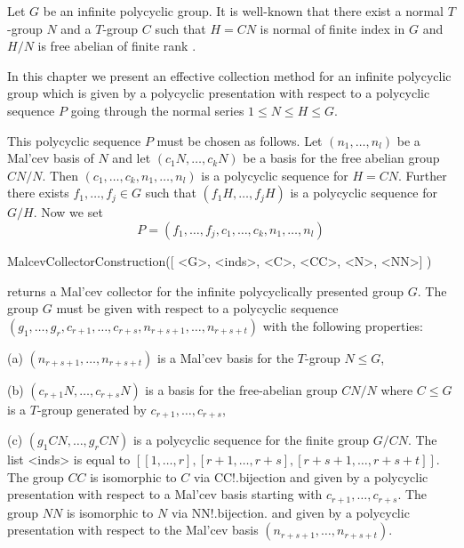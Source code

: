 

Let $G$ be an infinite polycyclic group. It is well-known that
there exist  a normal
${T}$-group $N$ and a ${T}$-group $C$ such that $H=CN$ is normal
of finite
index in $G$ and  $H/N$ is free abelian of finite rank \cite{Seg83}. 

In this chapter
we present an effective collection method for an infinite
polycyclic group which is given by a polycyclic presentation 
with respect
to a polycyclic sequence $P$ going through the normal
series $1 \le N \le H \le G$.

This polycyclic sequence $P$ must be chosen as follows.
Let $(n_1,\dots,n_l)$ be a Mal'cev basis of $N$ and let
$(c_1N,\dots,c_k N)$ be a basis for
the free abelian group $CN/N$.
Then $(c_1,\dots,c_k,n_1,\dots,n_l)$
is a polycyclic sequence for $H=CN$. Further there exists
$f_1,\dots, f_j \in G$ such that $(f_1 H, \dots, f_j H)$ is
a polycyclic sequence for $G/H$. Now we set
$$P = (f_1,\dots,f_j, c_1, \dots , c_k, n_1, \dots, n_l )$$


\> MalcevCollectorConstruction([ <G>, <inds>, <C>, <CC>, <N>, <NN>] )

returns a Mal'cev collector for the infinite polycyclically presented group 
$G$. The group $G$ must be given with respect to a polycyclic sequence 
$(g_1,\dots,g_r, c_{r+1}, \dots, c_{r+s}, n_{r+s+1}, \dots, n_{r+s+t})$
with the following properties:
\beginlist
\item{(a)}
$(n_{r+s+1}, \dots, n_{r+s+t})$ is a Mal'cev basis for the $T$-group 
$N \leq G$,
\item{(b)}  $(c_{r+1}N, \dots, c_{r+s}N)$ is a basis for the 
free-abelian group $CN/N$ where $C \leq G$ is a $T$-group generated by 
$ c_{r+1}, \dots, c_{r+s} $, 
\item{(c)}
$(g_1 CN, \dots, g_r CN)$ is a polycyclic sequence for the finite
group $G/CN$.
\endlist 
The list <inds> is equal to 
$[ [1,\dots,r],[r+1,\dots,r+s],[r+s+1,\dots,r+s+t]]$. 
The group $CC$ is isomorphic to $C$ via CC!.bijection 
and given by a polycyclic presentation with respect 
to a Mal'cev basis starting with $ c_{r+1}, \dots, c_{r+s}$.
The  group $NN$ is isomorphic to $N$ via NN!.bijection.
and given by a polycyclic presentation with respect 
to the Mal'cev basis $( n_{r+s+1}, \dots, n_{r+s+t})$.

